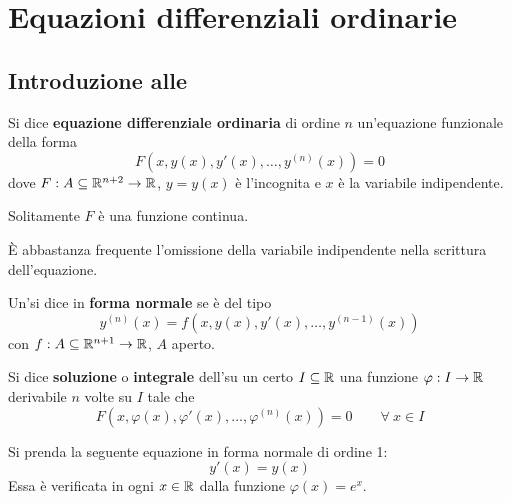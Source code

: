 \chapter{Equazioni differenziali ordinarie}
\section{Introduzione alle \odes}
\begin{definition} \label{Def: ODE}
Si dice \textbf{equazione differenziale ordinaria} di ordine $n$ un'equazione funzionale della forma
\begin{equation*}
    F\left(x, y(x), y'(x), \dots, y^{(n)}(x)\right)=0
\end{equation*}
dove  $F:A \subseteq \mathbb{R}^{n+2} \to \mathbb{R}$, $y=y(x)$ è l'incognita e $x$ è la variabile indipendente.
\end{definition}
\begin{oss}
    Solitamente $F$ è una funzione continua.
\end{oss}
\begin{oss}
    È abbastanza frequente l'omissione della variabile indipendente nella scrittura dell'equazione.
\end{oss}
\begin{definition} \label{Def: ODE in forma normale}
    Un'\ode si dice in \textbf{forma normale} se è del tipo
    \begin{equation*}
        y^{(n)}(x)=f\left(x, y(x), y'(x), \dots, y^{(n-1)}(x)\right)
    \end{equation*}
    con $f:A\subseteq \mathbb{R}^{n+1} \to \mathbb{R}$, $A$ aperto.
\end{definition}
\begin{definition} \label{Def: Soluzione di un'ode}
    Si dice \textbf{soluzione} o \textbf{integrale} dell'\ode su un certo $I\subseteq \mathbb{R}$ una funzione $\varphi: I \to \mathbb{R}$ derivabile $n$ volte su $I$ tale che 
    \begin{equation*}
         F\left(x, \varphi(x), \varphi'(x), \dots, \varphi^{(n)}(x)\right)=0 \qquad \forall\ x \in I
    \end{equation*}
\end{definition}
\begin{example}
    Si prenda la seguente equazione in forma normale di ordine 1: 
    \begin{equation*}
        y'(x)=y(x)
    \end{equation*}
    Essa è verificata in ogni $x \in \mathbb{R}$ dalla funzione $\varphi(x)= e^x$.
\end{example}
